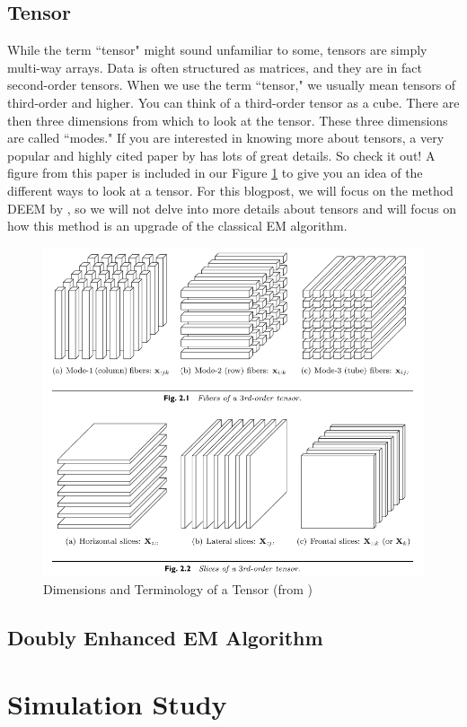 \documentclass[11pt]{article}
\begin{document}
\subsection{Tensor}

While the term ``tensor" might sound unfamiliar to some, tensors are simply multi-way arrays. Data is often structured as matrices, and they are in fact second-order tensors. When we use the term ``tensor," we usually mean tensors of third-order and higher. You can think of a third-order tensor as a cube. There are then three dimensions from which to look at the tensor. These three dimensions are called ``modes."  If you are interested in knowing more about tensors, a very popular and highly cited paper by \cite{kolda2009review} has lots of great details. So check it out! A figure from this paper is included in our Figure \ref{fig:tensor} to give you an idea of the different ways to look at a tensor. For this blogpost, we will focus on the method DEEM by \cite{mai2022DEEM}, so we will not delve into more details about tensors and will focus on how this method is an upgrade of the classical EM algorithm.

\begin{figure}
    \centering
    \includegraphics[width = 10 cm]{tensor.png}
    \caption{Dimensions and Terminology of a Tensor (from \cite{kolda2009review})}
    \label{fig:tensor}
\end{figure}

\subsection{Doubly Enhanced EM Algorithm}

\section{Simulation Study}
\end{document}

